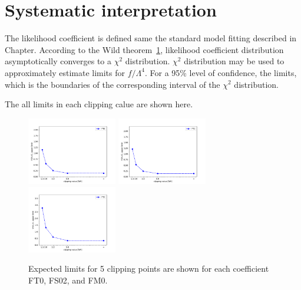 \section{Systematic interpretation}

The likelihood coefficient is defined same the standard model fitting described in Chapter{}.
According to the Wild theorem~\ref{}, likelihood coefficient distribution asymptotically converges to a $\chi^2$ distribution. 
$\chi^2$ distribution may be used to approximately estimate limits for $f/\Lambda^4$.
For a 95\% level of confidence, the limits, which is the boundaries of the corresponding interval of the $\chi^2$ distribution.

The all limits in each clipping calue are shown here.

\begin{figure}[ht]
    \centering
    	\includegraphics[width=0.35\textwidth]{figures/aQGC/ClippedFT0.pdf}
    	\includegraphics[width=0.35\textwidth]{figures/aQGC/ClippedFT1.pdf}
    	\includegraphics[width=0.35\textwidth]{figures/aQGC/ClippedFT2.pdf}
        \caption{Expected limits for 5 clipping points are shown for each coefficient FT0, FS02, and FM0.}
        \label{fig:ClippedLimits}
\end{figure}

